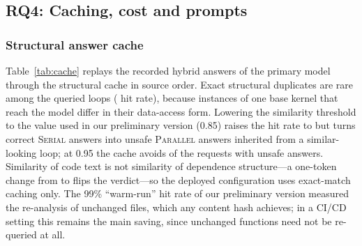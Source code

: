 

\subsection{RQ4: Caching, cost and prompts}

\subsubsection{Structural answer cache}
\label{sec:rq-cache}
Table~\ref{tab:cache} replays the recorded hybrid answers of the primary model through the structural cache in source order. Exact structural duplicates are rare among the queried loops (\cacheHitExact{} hit rate), because instances of one base kernel that reach the model differ in their data-access form. Lowering the similarity threshold to the value used in our preliminary version (0.85) raises the hit rate to \cacheHitEightyFive{} but turns \cacheFPCEightyFive{} correct \textsc{Serial} answers into unsafe \textsc{Parallel} answers inherited from a similar-looking loop; at 0.95 the cache avoids \cacheHitNinetyFive{} of the requests with \cacheFPCNinetyFive{} unsafe answers. Similarity of code text is not similarity of dependence structure---a one-token change from  to  flips the verdict---so the deployed configuration uses exact-match caching only. The 99\% ``warm-run'' hit rate of our preliminary version measured the re-analysis of unchanged files, which any content hash achieves; in a CI/CD setting this remains the main saving, since unchanged functions need not be re-queried at all.



